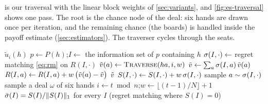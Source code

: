  is our traversal with the linear block weights of \cref{sec:variants}, and \cref{fig:es-traversal}
shows one pass. The root is the chance node of the deal: six hands are drawn once per iteration, and the remaining
chance (the boards) is handled inside the payoff estimate (\cref{sec:estimators}). The traverser cycles through the
seats.

\begin{algorithm}[t]
\caption{External-sampling MCCFR with block-linear weights. $R$ and $S$ are the regret and strategy-sum tables,
initialised to zero, and $N$ is the block length.}\label{alg:es-mccfr}
\begin{algorithmic}[1]
    \State \Return $\tilde u_i(h)$ 
  \EndIf
  \State $p \gets P(h)$;\quad $I \gets$ the information set of $p$ containing $h$
  \State $\sigma(I,\cdot) \gets$ regret matching \eqref{eq:rm} on $R(I,\cdot)$
      \State $\tilde\cfv(a) \gets \Call{Traverse}{ha, i, w}$
    \EndFor
    \State $\tilde{v} \gets \sum_{a} \sigma(I,a)\,\tilde{v}(a)$
      \State $R(I,a) \gets R(I,a) + w\,\big(\tilde{v}(a) - \tilde{v}\big)$
    \EndFor
    \State \Return $\tilde{v}$
  \Else
    \State $S(I,\cdot) \gets S(I,\cdot) + w\,\sigma(I,\cdot)$ 
    \State sample $a \sim \sigma(I,\cdot)$
    \State \Return {}
  \EndIf
\EndFunction
\Statex
{}
  \State sample a deal $\omega$ of six hands 
  \State $i \gets t \bmod n$;\quad $w \gets \lfloor (t-1)/N \rfloor + 1$ 
  \State {}
\EndFor
\State \Return $\bar\sigma(I) = S(I)/\lVert S(I)\rVert_1$ for every $I$ (regret matching where $S(I) = 0$)
\end{algorithmic}
\end{algorithm}


